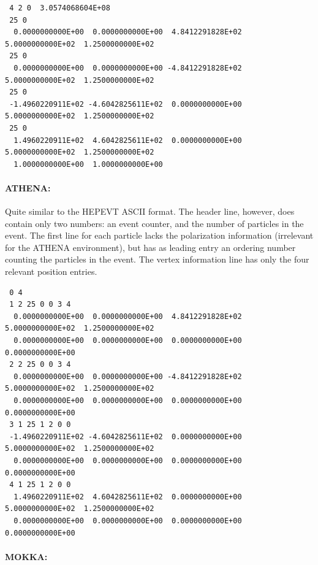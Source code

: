 \documentclass[12pt]{book}
\begin{document}
\begin{scriptsize}
  \begin{verbatim}
 4 2 0  3.0574068604E+08
 25 0
  0.0000000000E+00  0.0000000000E+00  4.8412291828E+02  5.0000000000E+02  1.2500000000E+02
 25 0
  0.0000000000E+00  0.0000000000E+00 -4.8412291828E+02  5.0000000000E+02  1.2500000000E+02
 25 0
 -1.4960220911E+02 -4.6042825611E+02  0.0000000000E+00  5.0000000000E+02  1.2500000000E+02
 25 0
  1.4960220911E+02  4.6042825611E+02  0.0000000000E+00  5.0000000000E+02  1.2500000000E+02
  1.0000000000E+00  1.0000000000E+00
  \end{verbatim}
\end{scriptsize}

\paragraph{ATHENA:}

Quite similar to the HEPEVT ASCII format. The header line, however,
does contain only two numbers: an event counter, and the number of
particles in the event. The first line for each particle lacks the
polarization information (irrelevant for the ATHENA environment), but
has as leading entry an ordering number counting the particles in the
event. The vertex information line has only the four relevant position
entries.


\begin{scriptsize}
  \begin{verbatim}
 0 4
 1 2 25 0 0 3 4
  0.0000000000E+00  0.0000000000E+00  4.8412291828E+02  5.0000000000E+02  1.2500000000E+02
  0.0000000000E+00  0.0000000000E+00  0.0000000000E+00  0.0000000000E+00
 2 2 25 0 0 3 4
  0.0000000000E+00  0.0000000000E+00 -4.8412291828E+02  5.0000000000E+02  1.2500000000E+02
  0.0000000000E+00  0.0000000000E+00  0.0000000000E+00  0.0000000000E+00
 3 1 25 1 2 0 0
 -1.4960220911E+02 -4.6042825611E+02  0.0000000000E+00  5.0000000000E+02  1.2500000000E+02
  0.0000000000E+00  0.0000000000E+00  0.0000000000E+00  0.0000000000E+00
 4 1 25 1 2 0 0
  1.4960220911E+02  4.6042825611E+02  0.0000000000E+00  5.0000000000E+02  1.2500000000E+02
  0.0000000000E+00  0.0000000000E+00  0.0000000000E+00  0.0000000000E+00
  \end{verbatim}
\end{scriptsize}

\paragraph{MOKKA:}
\end{document}
